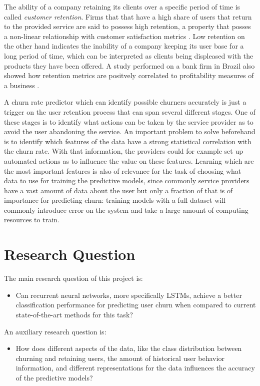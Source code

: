 \documentclass{kththesis}
\begin{document}
The ability of a company retaining its clients over a specific period of time is called \emph{customer retention}. Firms that that have a high share of users that return to the provided service are said to possess high retention, a property that posses a non-linear relationship with customer satisfaction  metrics \citep{hennig1997impact}. Low retention on the other hand indicates the inability of a company keeping its user base for a long period of time, which can be interpreted as clients being displeased with the products they have been offered. A study performed on a bank firm in Brazil also showed how retention metrics are positvely correlated to profitability measures of a business \citep{morgan2006value}. 
        
A churn rate predictor which can identify possible churners accurately is just a trigger on the user retention process that can span several different stages. One of these stages is to identify what actions can be taken by the service provider as to avoid the user abandoning the service. An important problem to solve beforehand is to identify which features of the data have a strong statistical correlation with the churn rate. With that information, the providers could for example set up automated actions as to influence the value on these features. Learning which are the most important features is also of relevance for the task of choosing what data to use for training the predictive models, since commonly service providers have a vast amount of data about the user but only a fraction of that is of importance for predicting churn: training models with a full dataset will commonly introduce error on the system and take a large amount of computing resources to train.
	
\section{Research Question}	
	
The main research question of this project is:

\begin{itemize}
\item Can recurrent neural networks, more specifically LSTMs, achieve a better classification performance for predicting user churn when compared to current state-of-the-art methods for this task?
\end{itemize}	

An auxiliary research question is:

\begin{itemize}
\item How does different aspects of the data, like the class distribution between churning and retaining users, the amount of historical user behavior information, and different representations for the data influences the accuracy of the predictive models?
\end{itemize}
\end{document}
